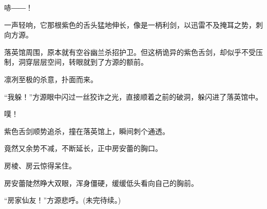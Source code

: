 \begin{this_body}
哧――！

一声轻响，它那根紫色的舌头猛地伸长，像是一柄利剑，以迅雷不及掩耳之势，刺向方源。

落英馆周围，原本就有空谷幽兰杀招护卫。但这柄诡异的紫色舌剑，却似乎不受压制，洞穿层层空间，转眼就到了方源的额前。

凛冽至极的杀意，扑面而来。

“我躲！”方源眼中闪过一丝狡诈之光，直接顺着之前的破洞，躲闪进了落英馆中。

噗！

紫色舌剑顺势追杀，撞在落英馆上，瞬间刺个通透。

竟然又余势不减，不断延长，正中房安蕾的胸口。

房棱、房云惊得呆住。

房安蕾陡然睁大双眼，浑身僵硬，缓缓低头看向自己的胸前。

“房家仙友！”方源悲呼。(未完待续。)

\end{this_body}

